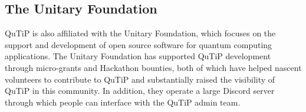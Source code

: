 \documentclass[preprint,3p,sort&compress]{elsarticle}
\begin{document}

\subsection{The Unitary Foundation}

QuTiP is also affiliated with the Unitary Foundation, which focuses on the support and development of open source software for quantum computing applications. The Unitary Foundation has supported QuTiP development through micro-grants and Hackathon bounties, both of which have helped nascent volunteers to contribute to QuTiP and substantially raised the visibility of QuTiP in this community.  In addition, they operate a large Discord server through which people can interface with the QuTiP admin team.
\end{document}
